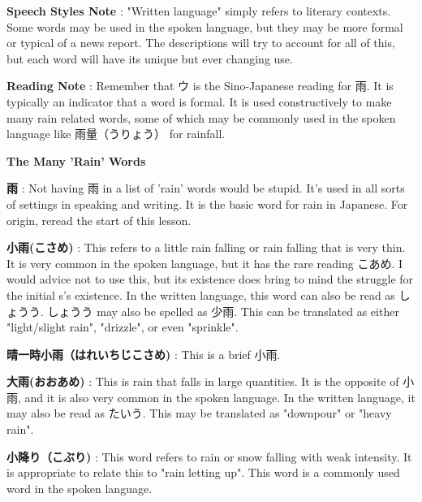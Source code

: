 \par{\textbf{Speech Styles Note }: "Written language" simply refers to literary contexts. Some words may be used in the spoken language, but they may be more formal or typical of a news report. The descriptions will try to account for all of this, but each word will have its unique but ever changing use. }

\par{\textbf{Reading Note }: Remember that ウ is the Sino-Japanese reading for 雨. It is typically an indicator that a word is formal. It is used constructively to make many rain related words, some of which may be commonly used in the spoken language like 雨量（うりょう） for rainfall. }

\begin{center}
 \textbf{The Many 'Rain' Words }
\end{center}

\par{\textbf{雨 }: Not having 雨 in a list of 'rain' words would be stupid. It's used in all sorts of settings in speaking and writing. It is the basic word for rain in Japanese. For origin, reread the start of this lesson. }

\par{\textbf{小雨(こさめ) }: This refers to a little rain falling or rain falling that is very thin. It is very common in the spoken language, but it has the rare reading こあめ. I would advice not to use this, but its existence does bring to mind the struggle for the initial s's existence. In the written language, this word can also be read as しょうう. しょうう may also be spelled as 少雨. This can be translated as either "light\slash slight rain", "drizzle", or even "sprinkle". }

\par{\textbf{晴一時小雨（はれいちじこさめ) }: This is a brief 小雨. }

\par{\textbf{大雨(おおあめ) }: This is rain that falls in large quantities. It is the opposite of 小雨, and it is also very common in the spoken language. In the written language, it may also be read as たいう. This may be translated as "downpour" or "heavy rain". }

\par{\textbf{小降り（こぶり) }: This word refers to rain or snow falling with weak intensity. It is appropriate to relate this to "rain letting up". This word is a commonly used word in the spoken language. }

